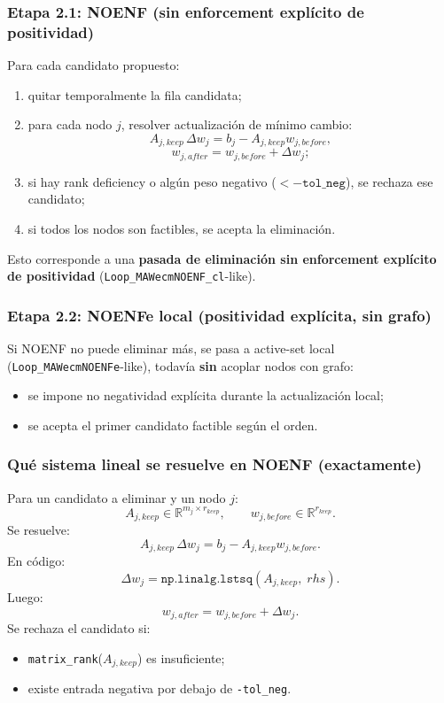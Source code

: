 \documentclass[11pt,a4paper]{article}
\begin{document}
\subsubsection*{Etapa 2.1: NOENF (sin enforcement explícito de positividad)}
Para cada candidato propuesto:
\begin{enumerate}[leftmargin=1.5em]
\item quitar temporalmente la fila candidata;
\item para cada nodo $j$, resolver actualización de mínimo cambio:
\[
A_{j,keep}\,\Delta w_j=b_j-A_{j,keep}w_{j,before},
\]
\[
w_{j,after}=w_{j,before}+\Delta w_j;
\]
\item si hay rank deficiency o algún peso negativo ($<-\texttt{tol\_neg}$), se rechaza ese candidato;
\item si todos los nodos son factibles, se acepta la eliminación.
\end{enumerate}
Esto corresponde a una \textbf{pasada de eliminación sin enforcement explícito de positividad}
(\texttt{Loop\_MAWecmNOENF\_cl}-like).

\subsubsection*{Etapa 2.2: NOENFe local (positividad explícita, sin grafo)}
Si NOENF no puede eliminar más, se pasa a active-set local
(\texttt{Loop\_MAWecmNOENFe}-like), todavía \textbf{sin} acoplar nodos con grafo:
\begin{itemize}[leftmargin=1.5em]
\item se impone no negatividad explícita durante la actualización local;
\item se acepta el primer candidato factible según el orden.
\end{itemize}

\subsubsection*{Qué sistema lineal se resuelve en NOENF (exactamente)}
Para un candidato a eliminar y un nodo $j$:
\[
A_{j,keep}\in\mathbb{R}^{m_j\times r_{keep}},
\qquad
w_{j,before}\in\mathbb{R}^{r_{keep}}.
\]
Se resuelve:
\[
A_{j,keep}\,\Delta w_j = b_j - A_{j,keep}w_{j,before}.
\]
En código:
\[
\Delta w_j=\texttt{np.linalg.lstsq}(A_{j,keep},\;rhs).
\]
Luego:
\[
w_{j,after}=w_{j,before}+\Delta w_j.
\]
Se rechaza el candidato si:
\begin{itemize}[leftmargin=1.5em]
\item \texttt{matrix\_rank}($A_{j,keep}$) es insuficiente;
\item existe entrada negativa por debajo de \texttt{-tol\_neg}.
\end{itemize}
\end{document}
